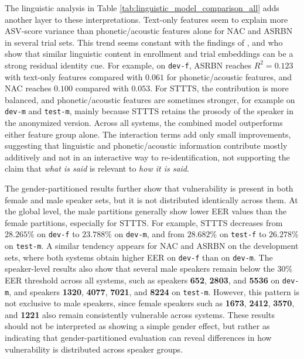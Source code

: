 \documentclass[12pt,leqno,a4paper]{article}
\begin{document}
The linguistic analysis in Table \ref{tab:linguistic_model_comparison_all} adds another layer to these interpretations. Text-only features seem to explain more ASV-score variance than phonetic/acoustic features alone for NAC and ASRBN in several trial sets. 
This trend seems constant with the findings of \cite{gaznepoglu2025sayexploitinglinguisticcontent}, \cite{franzreb_content_2026} and \cite{franzreb_private_2025} who show that similar linguistic content in enrollment and trial embeddings can be a strong residual identity cue.
For example, on \texttt{dev-f}, ASRBN reaches $R^2=0.123$ with text-only features compared with $0.061$ for phonetic/acoustic features, and NAC reaches $0.100$ compared with $0.053$. 
For STTTS, the contribution is more balanced, and phonetic/acoustic features are sometimes stronger, for example on \texttt{dev-m} and \texttt{test-m}, mainly because STTTS retains the prosody of the speaker in the anonymized version. Across all systems, the combined model outperforms either feature group alone.
The interaction terms add only small improvements, suggesting that linguistic and phonetic/acoustic information contribute mostly additively and not in an interactive way to re-identification, not supporting the claim that \textit{what is said} is relevant to \textit{how it is said}.

The gender-partitioned results further show that vulnerability is present in both female and male speaker sets, but it is not distributed identically across them. At the global level, the male partitions generally show lower EER values than the 
female partitions, especially for STTTS. For example, STTTS decreases from $28.265\%$ on \texttt{dev-f} to $23.788\%$ on \texttt{dev-m}, and from $28.682\%$ on \texttt{test-f} to $26.278\%$ on \texttt{test-m}. 
A similar tendency appears for NAC and ASRBN on the development sets, where both systems obtain higher EER on \texttt{dev-f} than on \texttt{dev-m}. 
The speaker-level results also show that several male speakers remain below the $30\%$ EER threshold across all systems, such as speakers \textbf{652}, \textbf{2803}, and \textbf{5536} on \texttt{dev-m}, and speakers \textbf{1320}, \textbf{4077}, \textbf{7021}, and \textbf{8224} on \texttt{test-m}. 
However, this pattern is not exclusive to male speakers, since female speakers such as \textbf{1673}, \textbf{2412}, \textbf{3570}, and \textbf{1221} also remain consistently vulnerable across systems. These results should not be interpreted as showing a simple gender effect, but rather as indicating 
that gender-partitioned evaluation can reveal differences in how vulnerability is distributed across speaker groups.
\end{document}
